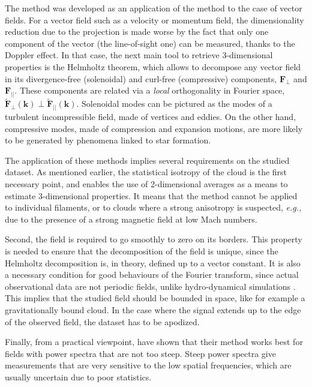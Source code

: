 \documentclass[structabstract]{aa}
\newcommand{\eg}{{\em e.g.,}}
\begin{document}
The \citet{brunt14} method was developed as an application of the \citet{brunt10} method to the case of vector fields. For a vector field such as a velocity or momentum field, the dimensionality reduction due to the projection is made worse by the fact that only one component of the vector (the line-of-sight one) can be measured, thanks to the Doppler effect. In that case, the next main tool to retrieve 3-dimensional properties is the Helmholtz theorem, which allows to decompose any vector field in its divergence-free (solenoidal) and curl-free (compressive) components, $\mathbf{F}_\perp$ and $\mathbf{F}_{||}$. These components are related via a \emph{local} orthogonality in Fourier space, $\tilde{\mathbf{F}}_\perp(\mathbf{k}) \perp \tilde{\mathbf{F}}_{||}(\mathbf{k})$. Solenoidal modes can be pictured as the modes of a turbulent incompressible field, made of vertices and eddies. On the other hand, compressive modes, made of compression and expansion motions, are more likely to be generated by phenomena linked to star formation.

The application of these methods implies several requirements on the studied dataset. As mentioned earlier, the statistical isotropy of the cloud is the first necessary point, and enables the use of 2-dimensional averages as a means to estimate 3-dimensional properties. It means that the method cannot be applied to individual filaments, or to clouds where a strong anisotropy is suspected, \eg{} due to the presence of a strong magnetic field at low Mach numbers.

Second, the field is required to go smoothly to zero on its borders. This property is needed to ensure that the decomposition of the field is unique, since the Helmholtz decomposition is, in theory, defined up to a vector constant. It is also a necessary condition for good behaviours of the Fourier transform, since actual observational data are not periodic fields, unlike hydro-dynamical simulations \citep[see discussion in][]{brunt10}. This implies that the studied field should be bounded in space, like for example a gravitationally bound cloud. In the case where the signal extends up to the edge of the observed field, the dataset has to be apodized. 

Finally, from a practical viewpoint, \citet{brunt10} have shown that their method works best for fields with power spectra that are not too steep. Steep power spectra give measurements that are very sensitive to the low spatial frequencies, which are usually uncertain due to poor statistics.
\end{document}
